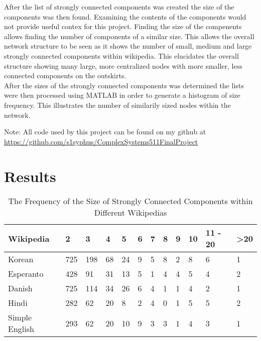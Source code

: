 \documentclass[twoside]{article}
\begin{document}
\begin{multicols}{2}
After the list of strongly connected components was created the size of the components was then found.
Examining the contents of the components would not provide useful contex for this project. Finding the
size of the compenents allows finding the number of components of a similar size. This allows the overall
network structure to be seen as it shows the number of small, medium and large strongly connected
components within wikipedia. This elucidates the overall structure showing many large, more centralized
nodes with more smaller, less connected components on the outskirts.\\

After the sizes of the strongly connected components was determined the lists were then
processed using MATLAB in order to generate a histogram of size frequency. This illustrates the
number of similarily sized nodes within the network.

Note: All code used by this project can be found on my github at \url{https://github.com/s1syphus/ComplexSystems511FinalProject}


\end{multicols}

\newpage

\section{Results}


\begin{table}[h]

\caption{The Frequency of the Size of Strongly Connected Components within Different Wikipedias}
\centering

\begin{tabular}{| l | l | l | l | l | l |  l | l | l | l | l | l | }

\hline

Wikipedia & 2 & 3 & 4 & 5 & 6 & 7 & 8 & 9 & 10 & {11 - 20} & >20 \\ \hline

Korean & 725 & 198 & 68 & 24 & 9 & 5 & 8 & 2 & 8 & 6 & 1 \\ \hline

Esperanto & 428 & 91 & 31 & 13 & 5 & 1 & 4 & 4 & 5 & 4 & 2 \\ \hline

Danish & 725 & 114 & 34 & 26 & 6 & 4 & 1 & 1 & 4 & 2 & 1 \\ \hline

Hindi & 282 & 62 & 20 & 8 & 2 & 4 & 0 & 1 & 5  & 5 & 2 \\ \hline

Simple English & 293  & 62 & 20 & 10 & 9 & 3 & 3 & 1 & 4 & 3 & 1 \\ \hline


\end{tabular}

\end{table}
\end{document}
